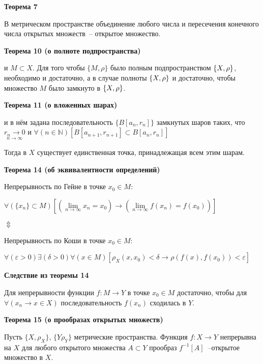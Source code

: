 \noindent\dotfill
    
\textbf{Теорема 7  }

В метрическом пространстве объединение любого числа и пересечения конечного числа
открытых множеств~-- открытое множество.

\noindent\dotfill
    
\textbf{Теорема 10 (о полноте подпространства) }

\MS и $M \subset X$. Для того чтобы $ \{M, \rho\}$ было полным подпространством
$\{X, \rho\}$, необходимо и достаточно, а в случае полноты $\{X, \rho\}$ и достаточно, чтобы
множество $M$ было замкнуто в $\{X, \rho\}$.

\noindent\dotfill
    
\textbf{Теорема 11 (о вложенных шарах) }

\MS и в нём задана последовательность $ \{ B[a_n, r_n] \} $ замкнутых шаров таких,
что $\underset{n \rightarrow \infty }{r_n \rightarrow 0}$ и $\forall(n \in \mathbb{N})[B[a_{n+1},
                r_{n+1}]\subset B[a_n, r_n]]$

Тогда в $X$ существует единственная точка, принадлежащая всем этим шарам.

\noindent\dotfill
    
\textbf{Теорема 14 (об эквивалентности определений)   }

Непрерывность по Гейне в точке $x_0 \in M$:

$\forall( \{ x_n \}\subset M)[(\underset{n \rightarrow \infty }{\lim} x_n = x_0 )\rightarrow
        (\underset{n \rightarrow \infty }{\lim}f(x_n)=f(x_0))]$

\hspace*{30mm}$\Updownarrow$

Непрерывность по Коши в точке $x_0 \in M$:

$\forall(\varepsilon>0)\exists(\delta>0)\forall(x \in M)[\rho_X(x, x_0)<\delta\rightarrow
        \rho(f(x), f(x_0))<\varepsilon]$

        \noindent\dotfill
    
\textbf{Следствие из теоремы 14}

Для непрерывности функции $f:M \rightarrow Y$ в точке $x_0 \in M$ достаточно, чтобы для
$\forall(x_n \rightarrow x \in X)$ последовательность ${f(x_n)}$ сходилась в $Y$.

\noindent\dotfill
    
\textbf{Теорема 15 (о прообразах открытых множеств) }

Пусть $\{X, \rho_X \}$, $\{Y \rho_Y \}$ метрические пространства. Функция $f:
    X \rightarrow Y$ непрерывна на $X$ \tttk для любого открытого множества $A \subset Y$
прообраз $f^{-1}[A]$~--открытое множество в $X$.

